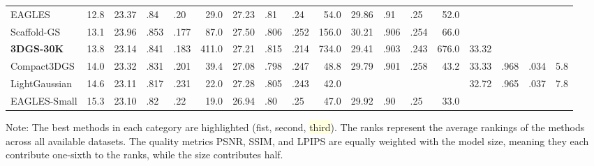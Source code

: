 {\begin{minipage}{\textheight}
\begin{adjustbox}{center}
\begin{tabular}{ll|lllr|lllr|lllr|lllr}
EAGLES & 12.8 & 23.37 & .84 & .20 & 29.0 & 27.23 & .81 & .24 & 54.0 & 29.86 & \cellcolor{lightorange}.91 & \cellcolor{lightyellow}.25 & 52.0 &  &  &  &  \\
Scaffold-GS & 13.1 & 23.96 & \cellcolor{lightorange}.853 & \cellcolor{lightorange}.177 & 87.0 & 27.50 & .806 & .252 & 156.0 & 30.21 & .906 & .254 & 66.0 &  &  &  &  \\
\textbf{3DGS-30K} & 13.8 & 23.14 & .841 & \cellcolor{lightyellow}.183 & 411.0 & 27.21 & \cellcolor{lightorange}.815 & \cellcolor{lightred}.214 & 734.0 & 29.41 & .903 & \cellcolor{lightred}.243 & 676.0 & 33.32 &  &  &  \\
Compact3DGS & 14.0 & 23.32 & .831 & .201 & 39.4 & 27.08 & .798 & .247 & 48.8 & 29.79 & .901 & .258 & 43.2 & 33.33 & \cellcolor{lightyellow}.968 & \cellcolor{lightyellow}.034 & 5.8 \\
LightGaussian & 14.6 & 23.11 & .817 & .231 & 22.0 & 27.28 & .805 & .243 & 42.0 &  &  &  &  & 32.72 & .965 & .037 & 7.8 \\
EAGLES-Small & 15.3 & 23.10 & .82 & .22 & 19.0 & 26.94 & .80 & .25 & 47.0 & 29.92 & .90 & \cellcolor{lightyellow}.25 & 33.0 &  &  &  &  \\
\bottomrule
\end{tabular}
        \end{adjustbox}
        \newline\newline
        \noindent Note: The best methods in each category are highlighted (\colorbox{lightred}{fist}, \colorbox{lightorange}{second}, \colorbox{lightyellow}{third}). The ranks represent the average rankings of the methods across all available datasets. The quality metrics PSNR, SSIM, and LPIPS are equally weighted with the model size, meaning they each contribute one-sixth to the ranks, while the size contributes half.

    \end{minipage}
}